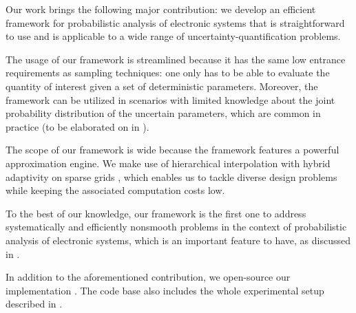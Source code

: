 Our work brings the following major contribution: we develop an efficient
framework for probabilistic analysis of electronic systems that is
straightforward to use and is applicable to a wide range of
uncertainty-quantification problems.

The usage of our framework is streamlined because it has the same low entrance
requirements as sampling techniques: one only has to be able to evaluate the
quantity of interest given a set of deterministic parameters. Moreover, the
framework can be utilized in scenarios with limited knowledge about the joint
probability distribution of the uncertain parameters, which are common in
practice (to be elaborated on in ).

The scope of our framework is wide because the framework features a powerful
approximation engine. We make use of hierarchical interpolation with hybrid
adaptivity on sparse grids \cite{jakeman2012, klimke2006, ma2009}, which enables
us to tackle diverse design problems while keeping the associated computation
costs low.

To the best of our knowledge, our framework is the first one to address
systematically and efficiently nonsmooth problems in the context of
probabilistic analysis of electronic systems, which is an important feature to
have, as discussed in .

In addition to the aforementioned contribution, we open-source our
implementation \cite{sources}. The code base also includes the whole
experimental setup described in .
